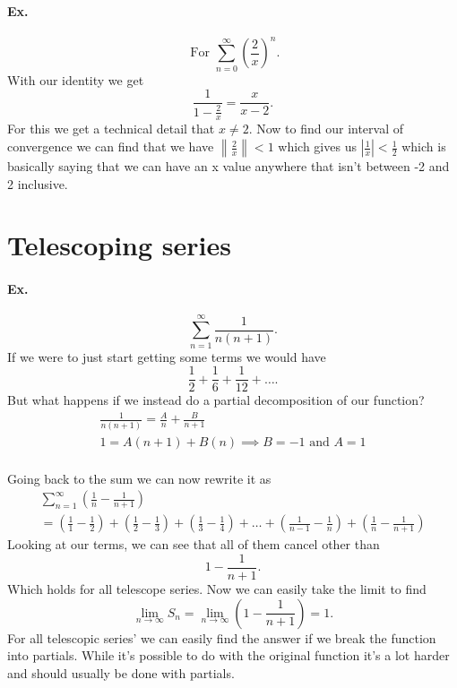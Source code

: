 \paragraph{Ex.}
\[
\text{ For }\sum_{ n=0 } ^{ \infty } \left( \frac{ 2 }{ x }  \right) ^{ n }
.\]
With our identity we get
\[
\frac{ 1 }{ 1-\frac{ 2 }{ x }  } =\frac{ x }{ x-2 } 
.\] 
For this we get a technical detail that $ x\neq 2 $. Now to find our interval of convergence we can find that we have $ \left\| \frac{ 2 }{ x }  \right\|<1 $ which gives us $ \left| \frac{ 1 }{ x }  \right|<\frac{ 1 }{ 2 }   $ which is basically saying that we can have an x value anywhere that isn't between -2 and 2 inclusive. 

\section{Telescoping series}%
\label{sec:Telescoping series}
\paragraph{Ex.}%
\label{par:Ex.}
\[
\sum_{ n=1 } ^{ \infty } \frac{ 1 }{ n\left( n+1 \right)  } 
.\] 
If we were to just start getting some terms we would have
\[
\frac{ 1 }{ 2 } +\frac{ 1 }{ 6 } +\frac{ 1 }{ 12 } +\ldots
.\] 
But what happens if we instead do a partial decomposition of our function?
\begin{gather*}
\frac{ 1 }{ n\left( n+1 \right)  } =\frac{ A }{ n } +\frac{ B }{ n+1 } \\
1=A\left( n+1 \right) +B\left( n \right) \implies B = -1 \text{ and }A=1\\
\end{gather*}

Going back to the sum we can now rewrite it as
\begin{gather*}
\sum_{ n=1 } ^{ \infty } \left( \frac{ 1 }{ n } -\frac{ 1 }{ n+1 }  \right) \\
=\left( \frac{ 1 }{ 1 } -\frac{ 1 }{ 2 }  \right) +\left( \frac{ 1 }{ 2 } -\frac{ 1 }{ 3 }  \right) +\left( \frac{ 1 }{ 3 } -\frac{ 1 }{ 4 }  \right) +\ldots+\left( \frac{ 1 }{ n-1 } -\frac{ 1 }{ n }  \right)  +\left( \frac{ 1 }{ n } -\frac{ 1 }{ n+1 }  \right) 
\end{gather*}
Looking at our terms, we can see that all of them cancel other than 
\[
1-\frac{ 1 }{ n+1 } 
.\] 
Which holds for all telescope series. Now we can easily take the limit to find 
\[
\lim_{ n \to \infty} S_n = \lim_{ n \to \infty} \left( 1-\frac{ 1 }{ n+1 }  \right) =1
.\] 
For all telescopic series' we can easily find the answer if we break the function into partials. While it's possible to do with the original function it's a lot harder and should usually be done with partials. 

